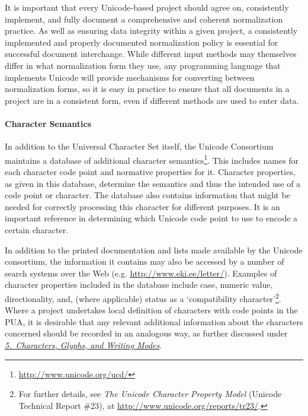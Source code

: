 It is important that every Unicode-based project should agree on, consistently implement, and fully document a comprehensive and coherent normalization practice. As well as ensuring data integrity within a given project, a consistently implemented and properly documented normalization policy is essential for successful document interchange. While different input methods may themselves differ in what normalization form they use, any programming language that implements Unicode will provide mechanisms for converting between normalization forms, so it is easy in practice to ensure that all documents in a project are in a consistent form, even if different methods are used to enter data.
\paragraph[{Character Semantics}]{Character Semantics}\label{D4-46-3}\par
In addition to the Universal Character Set itself, the Unicode Consortium maintains a database of additional character semantics\footnote{\url{http://www.unicode.org/ucd/}}. This includes names for each character code point and normative properties for it. Character properties, as given in this database, determine the semantics and thus the intended use of a code point or character. The database also contains information that might be needed for correctly processing this character for different purposes. It is an important reference in determining which Unicode code point to use to encode a certain character.\par
In addition to the printed documentation and lists made available by the Unicode consortium, the information it contains may also be accessed by a number of search systems over the Web (e.g. \url{http://www.eki.ee/letter/}). Examples of character properties included in the database include case, numeric value, directionality, and, (where applicable) status as a ‘compatibility character’\footnote{For further details, see \textit{The Unicode Character Property Model} (Unicode Technical Report \#23), at \url{http://www.unicode.org/reports/tr23/}.}. Where a project undertakes local definition of characters with code points in the PUA, it is desirable that any relevant additional information about the characters concerned should be recorded in an analogous way, as further discussed under \textit{\hyperref[WD]{5.\ Characters, Glyphs, and Writing Modes}}.
